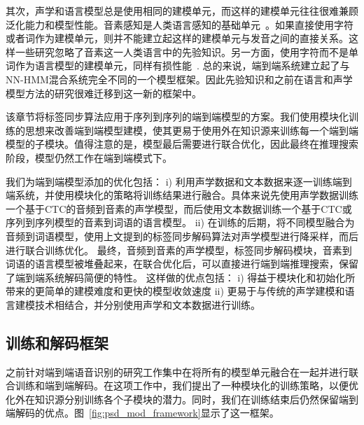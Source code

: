 其次，声学和语言模型总是使用相同的建模单元，而这样的建模单元往往很难兼顾泛化能力和模型性能。音素感知是人类语言感知的基础单元~\cite{pisoni1985speech}。如果直接使用字符或者词作为建模单元，则并不能建立起这样的建模单元与发音之间的直接关系。这样一些研究忽略了音素这一人类语言中的先验知识。另一方面，使用字符而不是单词作为语言模型的建模单元，同样有损性能~\cite{jozefowicz2016exploring}.
%
总的来说，端到端系统建立起了与NN-HMM混合系统完全不同的一个模型框架。因此先验知识和之前在语言和声学模型方法的研究很难迁移到这一新的框架中。

该章节将标签同步算法应用于序列到序列的端到端模型的方案。我们使用模块化训练的思想来改善端到端模型建模，使其更易于使用外在知识源来训练每一个端到端模型的子模块。值得注意的是，模型最后需要进行联合优化，因此最终在推理搜索阶段，模型仍然工作在端到端模式下。

我们为端到端模型添加的优化包括：
i) 利用声学数据和文本数据来逐一训练端到端系统，并使用模块化的策略将训练结果进行融合。具体来说先使用声学数据训练一个基于CTC的音频到音素的声学模型，而后使用文本数据训练一个基于CTC或序列到序列模型的音素到词语的语言模型。
ii) 在训练的后期，将不同模型融合为音频到词语模型，使用上文提到的标签同步解码算法对声学模型进行降采样，而后进行联合训练优化。
最终，音频到音素的声学模型，标签同步解码模块，音素到词语的语言模型被堆叠起来，在联合优化后，可以直接进行端到端推理搜索，保留了端到端系统解码简便的特性。
%
这样做的优点包括： i) 得益于模块化和初始化所带来的更简单的建模难度和更快的模型收敛速度 ii) 更易于与传统的声学建模和语言建模技术相结合，并分别使用声学和文本数据进行训练。


\subsection{训练和解码框架}
\label{sec:psd_mod_framework}

之前针对端到端语音识别的研究工作集中在将所有的模型单元融合在一起并进行联合训练和端到端解码。在这项工作中，我们提出了一种模块化的训练策略，以便优化外在知识源分别训练各个子模块的潜力。同时，我们在训练结束后仍然保留端到端解码的优点。图~\ref{fig:psd_mod_framework}显示了这一框架。


